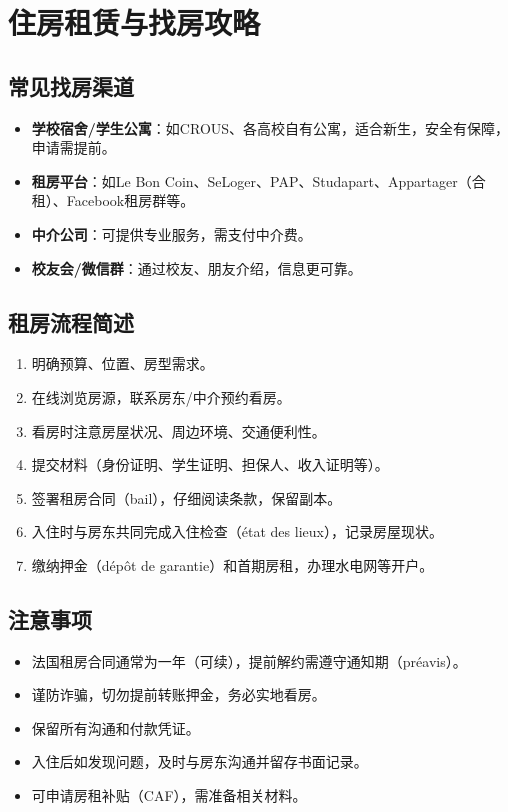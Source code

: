 \section{住房租赁与找房攻略}

\subsection{常见找房渠道}
\begin{itemize}
    \item \textbf{学校宿舍/学生公寓}：如CROUS、各高校自有公寓，适合新生，安全有保障，申请需提前。
    \item \textbf{租房平台}：如Le Bon Coin、SeLoger、PAP、Studapart、Appartager（合租）、Facebook租房群等。
    \item \textbf{中介公司}：可提供专业服务，需支付中介费。
    \item \textbf{校友会/微信群}：通过校友、朋友介绍，信息更可靠。
\end{itemize}

\subsection{租房流程简述}
\begin{enumerate}
    \item 明确预算、位置、房型需求。
    \item 在线浏览房源，联系房东/中介预约看房。
    \item 看房时注意房屋状况、周边环境、交通便利性。
    \item 提交材料（身份证明、学生证明、担保人、收入证明等）。
    \item 签署租房合同（bail），仔细阅读条款，保留副本。
    \item 入住时与房东共同完成入住检查（état des lieux），记录房屋现状。
    \item 缴纳押金（dépôt de garantie）和首期房租，办理水电网等开户。
\end{enumerate}

\subsection{注意事项}
\begin{itemize}
    \item 法国租房合同通常为一年（可续），提前解约需遵守通知期（préavis）。
    \item 谨防诈骗，切勿提前转账押金，务必实地看房。
    \item 保留所有沟通和付款凭证。
    \item 入住后如发现问题，及时与房东沟通并留存书面记录。
    \item 可申请房租补贴（CAF），需准备相关材料。
\end{itemize}

